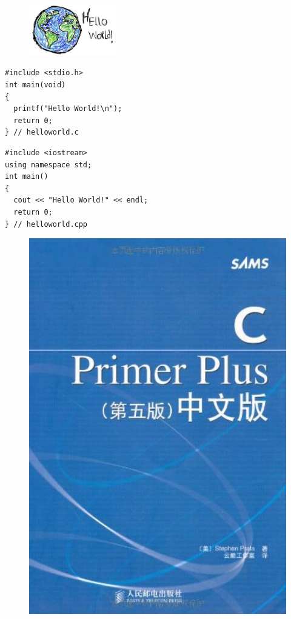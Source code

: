 \begin{frame}[fragile]
\begin{figure}
\centering
\includegraphics[width=1.5in]{slide01/images/helloworld.jpg}
\end{figure}
\pause 
\begin{lstlisting}
#include <stdio.h>
int main(void)
{
  printf("Hello World!\n");
  return 0;
} // helloworld.c
\end{lstlisting}
\pause 
\begin{lstlisting}
#include <iostream>
using namespace std;
int main()
{
  cout << "Hello World!" << endl;
  return 0;
} // helloworld.cpp
\end{lstlisting}


\end{frame}

\begin{frame}
\begin{figure}
\centering
\includegraphics[width=2.in]{slide01/images/cprimerplus.jpg}
\end{figure}
\end{frame}
